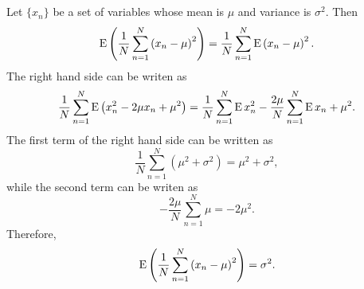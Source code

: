 \subsection{}
\label{1.13}
Let $\{ x_n \}$ be a set of variables whose mean is $\mu$ and variance is $\sigma ^ 2$.
Then
%
\begin{equation}
\operatorname{E} 
\left( 
	\frac{1}{N} 
	\sum_{n = 1}^{N} 
	\left(
		x_n 
		- 
		\mu 
	\right) ^ 2 
\right) 
= 
\frac{1}{N} 
\sum_{n = 1}^{N} 
\operatorname{E} 
\left( 
	x_n 
	- 
	\mu 
\right) ^ 2.
\end{equation}
%
The right hand side can be writen as 
%
\begin{equation}
\frac{1}{N} 
\sum_{n = 1}^{N} 
\operatorname{E} 
\left( 
	x_n ^ 2 
	- 
	2 \mu x_n 
	+ 
	\mu ^ 2 
\right) 
= 
\frac{1}{N} 
\sum_{n = 1}^{N} 
\operatorname{E} x_n ^ 2 
- 
\frac{2 \mu}{N}  
\sum_{n = 1}^{N} 
\operatorname{E} x_n 
+ 
\mu ^ 2.
\end{equation}
%
The first term of the right hand side can be written as 
%
\begin{equation}
\frac{1}{N} 
\sum_{n = 1}^{N} 
\left( 
	\mu ^ 2 
	+ 
	\sigma ^ 2 
\right) 
= 
\mu ^ 2 
+ 
\sigma ^ 2,
\end{equation}
%
while the second term can be writen as
%
\begin{equation}
- 
\frac{2 \mu}{N} 
\sum_{n = 1}^{N} 
\mu 
= 
- 
2 
\mu ^ 2.
\end{equation}
%
Therefore,
%
\begin{equation}
\operatorname{E} 
\left( 
	\frac{1}{N} 
	\sum_{n = 1}^{N} 
	\left( 
		x_n 
		- 
		\mu 
	\right) ^ 2 
\right) 
= 
\sigma ^2.
\end{equation}
%


